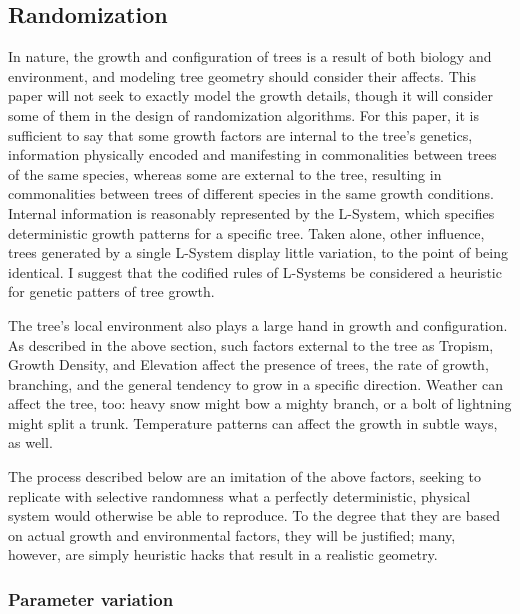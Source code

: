 \documentclass{article}
\newcommand{\tab}{\hspace*{2em}}
\begin{document}
        \subsection{Randomization}
    \tab In nature, the growth and configuration of trees is a result of both biology and
environment, and modeling tree geometry should consider their affects. This paper will not seek to
exactly model the growth details, though it will consider some of them in the design of
randomization algorithms. For this paper, it is sufficient to say that some growth factors are
internal to the tree's genetics, information physically encoded and manifesting in commonalities
between trees of the same species, whereas some are external to the tree, resulting in
commonalities between trees of different species in the same growth conditions\cite{hlt-rmyb}.
Internal information is reasonably represented by the L-System, which specifies deterministic
growth patterns for a specific tree. Taken alone, other influence, trees generated by a single
L-System display little variation, to the point of being identical. I suggest that the codified
rules of L-Systems be considered a heuristic for genetic patters of tree growth.

    \tab The tree's local environment also plays a large hand in growth and configuration. As
described in the above section, such factors external to the tree as Tropism, Growth Density, and
Elevation affect the presence of trees, the rate of growth, branching, and the general tendency
to grow in a specific direction. Weather can affect the tree, too: heavy snow might bow a mighty
branch, or a bolt of lightning might split a trunk. Temperature patterns can affect the growth in
subtle ways, as well.

    \tab The process described below are an imitation of the above factors, seeking to replicate
with selective randomness what a perfectly deterministic, physical system would otherwise be able
to reproduce. To the degree that they are based on actual growth and environmental factors, they
will be justified; many, however, are simply heuristic hacks that result in a realistic geometry.


            \subsubsection{Parameter variation}
\end{document}
